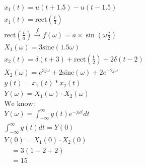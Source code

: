 \documentclass[journal,12pt,onecolumn]{IEEEtran}
\newcommand{\system}[1]{\stackrel{#1}{\rightarrow}}
\theoremstyle{remark}
\begin{document}
\begin{align}
& x_1(t) = u(t+1.5) - u(t-1.5) & \\
& x_1(t) = \text{rect}\left(\frac{t}{3}\right)&\\ 
& \text{rect}\left(\frac{t}{a}\right) \system{f} f(\omega) = a \times \sin(\omega \frac{a}{2}) \\
& X_1(\omega)=3\text{sinc}(1.5\omega) & \\
& x_2(t) = \delta(t+3) + \text{rect}\left(\frac{t}{2}\right) + 2\delta(t-2) & \\
& X_2(\omega) = e^{3j\omega} + 2\text{sinc}(\omega) + 2e^{-2j\omega} & \\
& y(t) = x_1(t) * x_2(t) & \\
& Y(\omega) = X_1(\omega) \cdot X_2(\omega) & \\
& \text{We know:} & \\
& Y(\omega) = \int_{-\infty}^{\infty} y(t)e^{-j\omega t} dt & \\
& \int_{-\infty}^{\infty} y(t) dt = Y(0) & \\
& Y(0) = X_1(0) \cdot X_2(0) & \\
& \quad = 3(1+2+2) & \\
& \quad = 15 &
\end{align}
\end{document}
